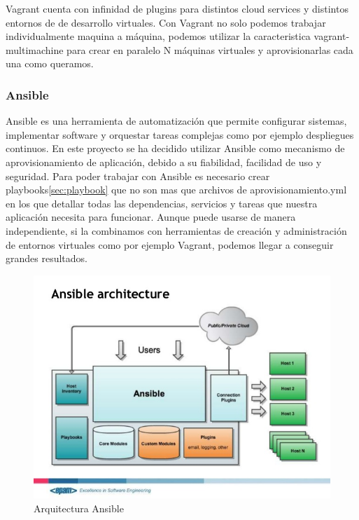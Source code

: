 \documentclass[a4paper,11pt]{book}
\begin{document}
Vagrant cuenta con infinidad de plugins para distintos cloud services y distintos entornos de de desarrollo virtuales. Con Vagrant no solo podemos trabajar individualmente maquina a máquina, podemos utilizar la caracteristica vagrant-multimachine para crear en paralelo N máquinas virtuales y aprovisionarlas cada una como queramos. 


\subsubsection{Ansible}

Ansible\cite{ans} es una herramienta de automatización que permite configurar sistemas, implementar software y orquestar tareas complejas como por ejemplo despliegues continuos. En este proyecto se ha decidido utilizar Ansible como mecanismo de aprovisionamiento de aplicación, debido a su fiabilidad, facilidad de uso y seguridad. Para poder trabajar con Ansible es necesario crear playbooks\ref{sec:playbook} que no son mas que archivos de aprovisionamiento.yml en los que detallar todas las dependencias, servicios y tareas que nuestra aplicación necesita para funcionar. Aunque puede usarse de manera independiente, si la combinamos con herramientas de creación y administración de entornos virtuales como por ejemplo Vagrant, podemos llegar a conseguir grandes resultados.

\begin{figure}[H] 
\centering 
\includegraphics[scale=0.35]{imagenes/desarrollo_herramienta/ansible.jpg}
\caption{ Arquitectura Ansible\cite{ans2}}
\end{figure}
\end{document}
